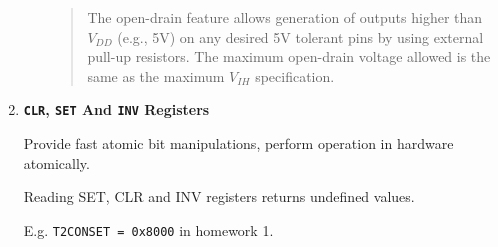 \documentclass[a4paper]{article}
\begin{document}
\begin{enumerate}[label = \arabic*.]
\begin{itemize}[leftmargin = 1cm]
\begin{quotation}
            \par The open-drain feature allows generation of outputs higher than \( V_{DD} \) (e.g., 5V) on any desired 5V tolerant pins by using external pull-up resistors. The maximum open-drain voltage allowed is the same as the maximum \( V_{IH} \) specification.
          \end{quotation}
      \end{itemize}

    \item \cprotect\textbf{\verb|CLR|, \verb|SET| And \verb|INV| Registers}
      \par Provide fast atomic bit manipulations, perform operation in hardware atomically.
      \par Reading SET, CLR and INV registers returns undefined
      values.
      \par E.g. \verb|T2CONSET = 0x8000| in homework 1.
  \end{enumerate}
\end{document}
